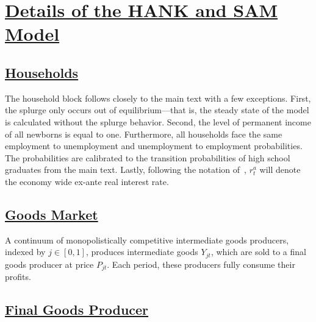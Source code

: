 \documentclass[\PathToRoot/\ProjectName]{subfiles}
\begin{document}
\FloatBarrier

\section{\href{https://econ-ark.github.io/HAFiscal/\#sec:appendix-hank}{Details of the HANK and SAM Model}}
\label{sec:appendix-hank} 


\subsection{\href{https://econ-ark.github.io/HAFiscal/\#sec:hank-households}{Households}}\label{sec:hank-households}

The household block follows closely to the main text with a few exceptions. First, the splurge only occurs out of equilibrium---that is, the steady state of the model is calculated without the splurge behavior. Second, the level of permanent income of all newborns is equal to one. Furthermore, all households face the same employment to unemployment and unemployment to employment probabilities. The probabilities are calibrated to the transition probabilities of high school graduates from the main text. Lastly, following the notation of~\cite{arsJumpsHumps}, $r^{a}_{t}$ will denote the economy wide ex-ante real interest rate.

\subsection{\href{https://econ-ark.github.io/HAFiscal/\#sec:goods-market}{Goods Market}}\label{sec:goods-market}

A continuum of monopolistically competitive intermediate goods producers, indexed by \( j \in [0,1] \), produces intermediate goods \( Y_{jt} \), which are sold to a final goods producer at price \( P_{jt} \). Each period, these producers fully consume their profits.

\subsection{\href{https://econ-ark.github.io/HAFiscal/\#sec:hank-final-goods-producer}{Final Goods Producer}}\label{sec:hank-final-goods-producer}
\end{document}
